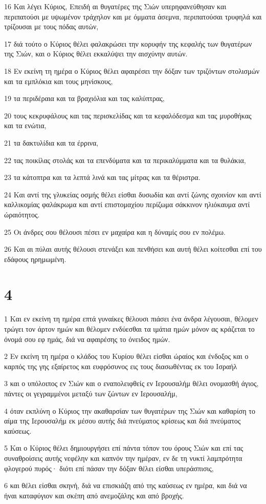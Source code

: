\par 16 Και λέγει Κύριος, Επειδή αι θυγατέρες της Σιών υπερηφανεύθησαν και περιπατούσι με υψωμένον τράχηλον και με όμματα άσεμνα, περιπατούσαι τρυφηλά και τρίζουσαι με τους πόδας αυτών,
\par 17 διά τούτο ο Κύριος θέλει φαλακρώσει την κορυφήν της κεφαλής των θυγατέρων της Σιών, και ο Κύριος θέλει εκκαλύψει την αισχύνην αυτών.
\par 18 Εν εκείνη τη ημέρα ο Κύριος θέλει αφαιρέσει την δόξαν των τριζόντων στολισμών και τα εμπλόκια και τους μηνίσκους,
\par 19 τα περιδέραια και τα βραχιόλια και τας καλύπτρας,
\par 20 τους κεκρυφάλους και τας περισκελίδας και τα κεφαλόδεσμα και τας μυροθήκας και τα ενώτια,
\par 21 τα δακτυλίδια και τα έρρινα,
\par 22 τας ποικίλας στολάς και τα επενδύματα και τα περικαλύμματα και τα θυλάκια,
\par 23 τα κάτοπτρα και τα λεπτά λινά και τας μίτρας και τα θέριστρα.
\par 24 Και αντί της γλυκείας οσμής θέλει είσθαι δυσωδία και αντί ζώνης σχοινίον και αντί καλλικομίας φαλάκρωμα και αντί επιστομαχίου περίζωμα σάκκινον ηλιόκαυμα αντί ώραιότητος.
\par 25 Οι άνδρες σου θέλουσι πέσει εν μαχαίρα και η δύναμίς σου εν πολέμω.
\par 26 Και αι πύλαι αυτής θέλουσι στενάξει και πενθήσει και αυτή θέλει κοίτεσθαι επί του εδάφους ηρημωμένη.

\chapter{4}

\par 1 Και εν εκείνη τη ημέρα επτά γυναίκες θέλουσι πιάσει ένα άνδρα λέγουσαι, θέλομεν τρώγει τον άρτον ημών και θέλομεν ενδύεσθαι τα ιμάτια ημών μόνον ας κράζεται το όνομά σου εφ ημάς, διά να αφαιρέσης το όνειδος ημών.
\par 2 Εν εκείνη τη ημέρα ο κλάδος του Κυρίου θέλει είσθαι ώραίος και ένδοξος και ο καρπός της γης εξαίρετος και ευφρόσυνος εις τους διασωθέντας εκ του Ισραήλ
\par 3 και ο υπόλοιπος εν Σιών και ο εναπολειφθείς εν Ιερουσαλήμ θέλει ονομασθή άγιος, πάντες οι γεγραμμένοι μεταξύ των ζώντων εν Ιερουσαλήμ,
\par 4 όταν εκπλύνη ο Κύριος την ακαθαρσίαν των θυγατέρων της Σιών και καθαρίση το αίμα της Ιερουσαλήμ εκ μέσου αυτής διά πνεύματος κρίσεως και διά πνεύματος καύσεως.
\par 5 Και ο Κύριος θέλει δημιουργήσει επί πάντα τόπον του όρους Σιών και επί τας συναθροίσεις αυτής νεφέλην και καπνόν την ημέραν, εν δε τη νυκτί λαμπρότητα φλογερού πυρός· διότι επί πάσαν την δόξαν θέλει είσθαι υπεράσπισις,
\par 6 και θέλει είσθαι σκηνή, διά να επισκιάζη από της καύσεως εν ημέρα, και διά να ήναι καταφύγιον και σκέπη από ανεμοζάλης και από βροχής.

